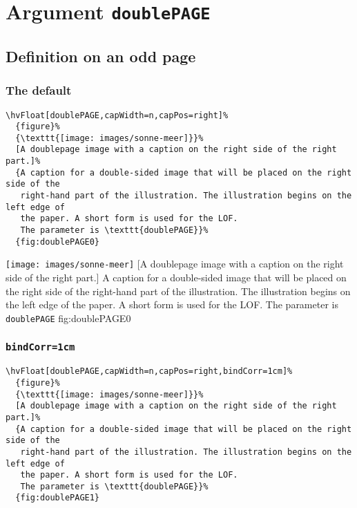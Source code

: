 \documentclass[twoside]{scrartcl}
\makeatletter
\let\hvBlindtext\Blindtext
\def\Blindtext{\par\color{black!40}\hvBlindtext\par\normalcolor}
\def\hvblindtext{\textcolor{black!40}{\blindtext@text}}
\makeatother
\begin{document}
\Blindtext

\Blindtext

\Blindtext



\clearpage

\section{Argument \texttt{doublePAGE}}
\subsection{Definition on an odd page}

\hvblindtext

\subsubsection{The default}

\begin{lstlisting}
\hvFloat[doublePAGE,capWidth=n,capPos=right]%
  {figure}%
  {\texttt{[image: images/sonne-meer]}}%
  [A doublepage image with a caption on the right side of the right part.]%
  {A caption for a double-sided image that will be placed on the right side of the
   right-hand part of the illustration. The illustration begins on the left edge of 
   the paper. A short form is used for the LOF. 
   The parameter is \texttt{doublePAGE}}%
  {fig:doublePAGE0}
\end{lstlisting}


%
  {\texttt{[image: images/sonne-meer]}}%
  [A doublepage image with a caption on the right side of the right part.]%
  {A caption for a double-sided image that will be placed on the right side of the
   right-hand part of the illustration. The illustration begins on the left edge of 
   the paper. A short form is used for the LOF. 
   The parameter is \texttt{doublePAGE}}%
  {fig:doublePAGE0}

\Blindtext

\Blindtext

\hvblindtext

\subsubsection{\texttt{bindCorr=1cm}}

\begin{lstlisting}
\hvFloat[doublePAGE,capWidth=n,capPos=right,bindCorr=1cm]%
  {figure}%
  {\texttt{[image: images/sonne-meer]}}%
  [A doublepage image with a caption on the right side of the right part.]%
  {A caption for a double-sided image that will be placed on the right side of the
   right-hand part of the illustration. The illustration begins on the left edge of 
   the paper. A short form is used for the LOF. 
   The parameter is \texttt{doublePAGE}}%
  {fig:doublePAGE1}
\end{lstlisting}
\end{document}
